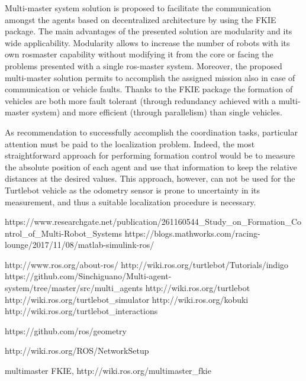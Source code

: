 \documentclass[journal]{IEEEtran}
\begin{document}
Multi-master system solution is proposed to facilitate the communication amongst the agents based on decentralized architecture by using the FKIE package. The main advantages of the presented solution are modularity and its wide applicability. Modularity allows to increase the number of robots with its own rosmaster capability without modifying it from the core or facing the problems presented with a single ros-master system.  Moreover, the proposed multi-master solution permits to accomplish the assigned mission also in case of communication or vehicle faults. Thanks to the FKIE package the formation of vehicles are both more fault tolerant (through redundancy achieved with a multi-master system) and more efficient (through parallelism) than single vehicles.


As recommendation to successfully accomplish the coordination tasks, particular attention must be paid to the localization problem. Indeed, the most straightforward approach for performing formation control would be to measure the absolute position of each agent and use that information to keep the relative distances at the desired values. This approach, however, can not be used for the Turtlebot vehicle as the odometry sensor is prone to uncertainty in its measurement, and thus a suitable localization procedure is necessary.

















\begin{thebibliography}{1}

https://www.researchgate.net/publication/261160544{\_}Study{\_}on{\_}Formation{\_}Control{\_}of{\_}Multi-Robot{\_}Systems
https://blogs.mathworks.com/racing-lounge/2017/11/08/matlab-simulink-ros/

http://www.ros.org/about-ros/
http://wiki.ros.org/turtlebot/Tutorials/indigo
https://github.com/Sinchiguano/Multi-agent-system/tree/master/src/multi{\_}agents
http://wiki.ros.org/turtlebot
http://wiki.ros.org/turtlebot{\_}simulator
http://wiki.ros.org/kobuki
http://wiki.ros.org/turtlebot{\_}interactions

https://github.com/ros/geometry

http://wiki.ros.org/ROS/NetworkSetup



multimaster FKIE, http://wiki.ros.org/multimaster{\_}fkie



\end{thebibliography}
\end{document}
